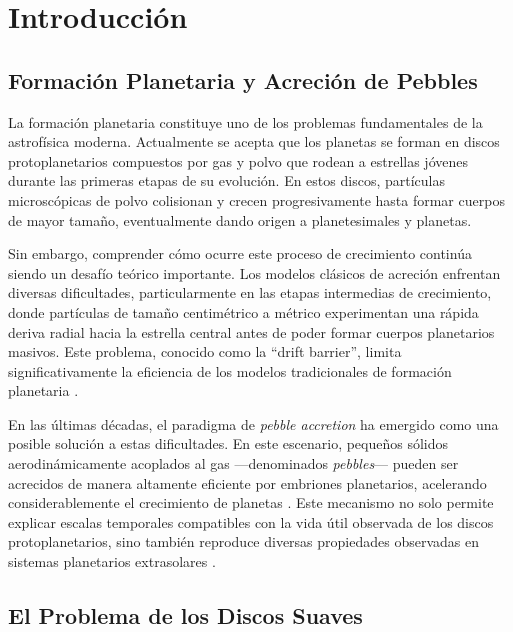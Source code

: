\chapter{Introducción}
\label{cap:introduccion}

\section{Formación Planetaria y Acreción de Pebbles}

La formación planetaria constituye uno de los problemas fundamentales de la astrofísica moderna. Actualmente se acepta que los planetas se forman en discos protoplanetarios compuestos por gas y polvo que rodean a estrellas jóvenes durante las primeras etapas de su evolución. En estos discos, partículas microscópicas de polvo colisionan y crecen progresivamente hasta formar cuerpos de mayor tamaño, eventualmente dando origen a planetesimales y planetas.

Sin embargo, comprender cómo ocurre este proceso de crecimiento continúa siendo un desafío teórico importante. Los modelos clásicos de acreción enfrentan diversas dificultades, particularmente en las etapas intermedias de crecimiento, donde partículas de tamaño centimétrico a métrico experimentan una rápida deriva radial hacia la estrella central antes de poder formar cuerpos planetarios masivos. Este problema, conocido como la ``drift barrier'', limita significativamente la eficiencia de los modelos tradicionales de formación planetaria \citep{Laibe2012, Blum2018}.

En las últimas décadas, el paradigma de \textit{pebble accretion} ha emergido como una posible solución a estas dificultades. En este escenario, pequeños sólidos aerodinámicamente acoplados al gas ---denominados \textit{pebbles}--- pueden ser acrecidos de manera altamente eficiente por embriones planetarios, acelerando considerablemente el crecimiento de planetas \citep{Lambrechts2014, Bitsch2015, 2019ApJ...883..192A}. Este mecanismo no solo permite explicar escalas temporales compatibles con la vida útil observada de los discos protoplanetarios, sino también reproduce diversas propiedades observadas en sistemas planetarios extrasolares \citep{Johansen2017, Ormel2017, Drazkowska2023, Lyra2023}.


\section{El Problema de los Discos Suaves}

